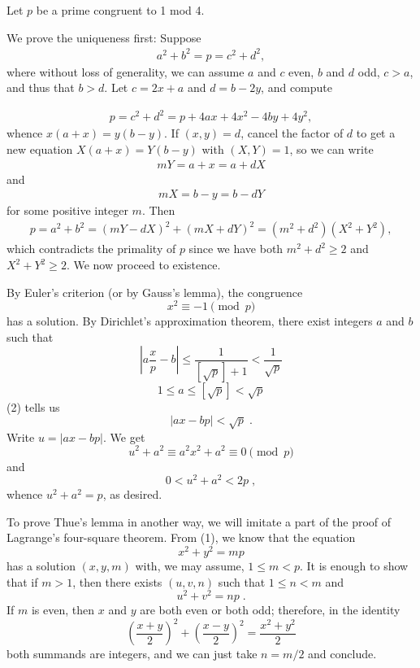 \documentclass[12pt]{article}
\begin{document}
Let $p$ be a prime congruent to 1 mod 4. 

We prove the uniqueness first:  Suppose 
\begin{align*}
a^2+b^2=p=c^2+d^2,
\end{align*}
where without loss of generality, we can assume $a$ and $c$ even, $b$ and $d$ odd, $c>a$, and thus that $b>d$.  Let $c=2x+a$ and $d=b-2y$, and compute

\begin{align*}
p=c^2+d^2=p+4ax+4x^2-4by+4y^2,
\end{align*}
whence $x(a+x)=y(b-y)$.  If $(x,y)=d$, cancel the factor of $d$ to get a new equation $X(a+x)=Y(b-y)$ with $(X,Y)=1$, so we can write
\begin{align*}
mY=a+x=a+dX
\end{align*}
and
\begin{align*}
mX=b-y=b-dY
\end{align*}
for some positive integer $m$.  Then 
\begin{align*}
p=a^2+b^2=(mY-dX)^2+(mX+dY)^2=(m^2+d^2)(X^2+Y^2),
\end{align*}
which contradicts the primality of $p$ since we have both $m^2+d^2\geq 2$ and $X^2+Y^2\geq 2$.  We now proceed to existence.

By Euler's criterion (or by
Gauss's lemma), the congruence
\begin{equation}
x^2 \equiv -1 \pmod{p}
\end{equation}
has a solution. By Dirichlet's approximation theorem, there exist
integers $a$ and $b$ such that
\begin{equation}
\left|a\frac{x}{p}-b\right|\le\frac{1}{[\sqrt{p}]+1}<\frac{1}{\sqrt{p}}
\end{equation}
$$1\le a\le [\sqrt{p}]<\sqrt{p}$$
(2) tells us
$$|ax-bp|<\sqrt{p}\;.$$
Write $u=|ax-bp|$. We get
$$u^2+a^2\equiv a^2x^2+a^2\equiv 0\pmod{p}$$
and
$$0<u^2+a^2<2p\;,$$
whence $u^2+a^2=p$, as desired.

To prove Thue's lemma in another way, we will imitate a part
of the proof of Lagrange's four-square theorem. From (1), we
know that the equation
\begin{equation}
x^2 + y^2 = mp
\end{equation}
has a solution $(x,y,m)$ with, we may assume, $1\le m<p$. It is enough to
show that if $m>1$, then there exists $(u,v,n)$ such that $1\le n<m$ and
$$u^2 + v^2 = np\;.$$
If $m$ is even, then $x$ and $y$ are both even or both odd; therefore,
in the identity
$$\left(\frac{x+y}{2}\right)^2+\left(\frac{x-y}{2}\right)^2=\frac{x^2+y^2}{2}$$
both summands are integers, and we can just take $n=m/2$ and conclude.
\end{document}

